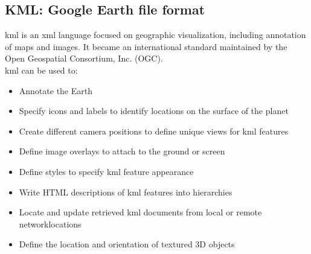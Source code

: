 \subsection{KML: Google Earth file format} %
\label{sub:kml_google_earth_file_format}
\acrshort{kml} is an \acrshort{xml} language focused on geographic visualization, including annotation of maps and images.
It became an international standard maintained by the Open Geospatial Consortium, Inc. (OGC).\\
\acrshort{kml} can be used to:
\begin{itemize}
\item Annotate the Earth
\item Specify icons and labels to identify locations on the surface of the planet
\item Create different camera positions to define unique views for \acrshort{kml} features
\item Define image overlays to attach to the ground or screen
\item Define styles to specify \acrshort{kml} feature appearance
\item Write HTML descriptions of \acrshort{kml} features into hierarchies
\item Locate and update retrieved \acrshort{kml} documents from local or remote networklocations
\item Define the location and orientation of textured 3D objects
\end{itemize}

